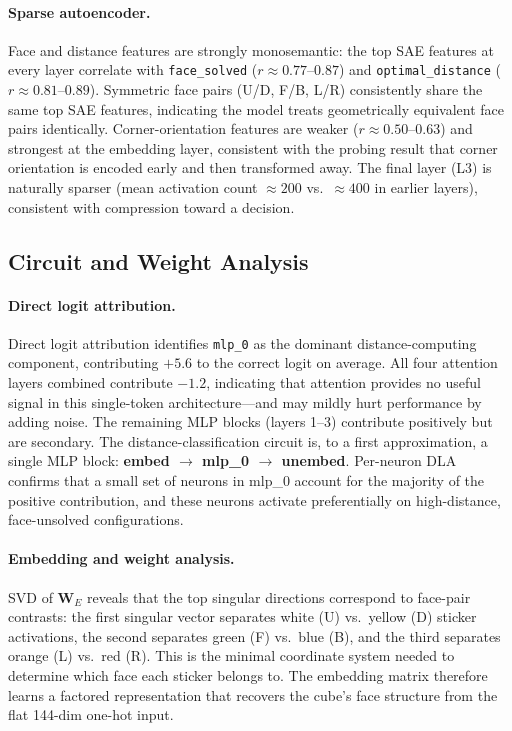 \documentclass[12pt]{article}
\begin{document}
\paragraph{Sparse autoencoder.}
Face and distance features are strongly monosemantic: the top SAE features at
every layer correlate with \texttt{face\_solved} ($r \approx 0.77$--$0.87$) and
\texttt{optimal\_distance} ($r \approx 0.81$--$0.89$).  Symmetric face pairs
(U/D, F/B, L/R) consistently share the same top SAE features, indicating the
model treats geometrically equivalent face pairs identically.  Corner-orientation
features are weaker ($r \approx 0.50$--$0.63$) and strongest at the embedding
layer, consistent with the probing result that corner orientation is encoded early
and then transformed away.  The final layer (L3) is naturally sparser (mean
activation count $\approx 200$ vs.\ $\approx 400$ in earlier layers), consistent
with compression toward a decision.

\subsection{Circuit and Weight Analysis}

\paragraph{Direct logit attribution.}
Direct logit attribution identifies \texttt{mlp\_0} as the dominant
distance-computing component, contributing $+5.6$ to the correct logit on
average.  All four attention layers combined contribute $-1.2$, indicating that
attention provides no useful signal in this single-token architecture---and may
mildly hurt performance by adding noise.  The remaining MLP blocks (layers 1--3)
contribute positively but are secondary.  The distance-classification circuit is,
to a first approximation, a single MLP block: \textbf{embed $\to$ mlp\_0 $\to$
unembed}.  Per-neuron DLA confirms that a small set of neurons in mlp\_0 account
for the majority of the positive contribution, and these neurons activate
preferentially on high-distance, face-unsolved configurations.

\paragraph{Embedding and weight analysis.}
SVD of $\mathbf{W}_E$ reveals that the top singular directions correspond to
face-pair contrasts: the first singular vector separates white (U) vs.\ yellow (D)
sticker activations, the second separates green (F) vs.\ blue (B), and the third
separates orange (L) vs.\ red (R).  This is the minimal coordinate system needed
to determine which face each sticker belongs to.  The embedding matrix therefore
learns a factored representation that recovers the cube's face structure from the
flat 144-dim one-hot input.
\end{document}
